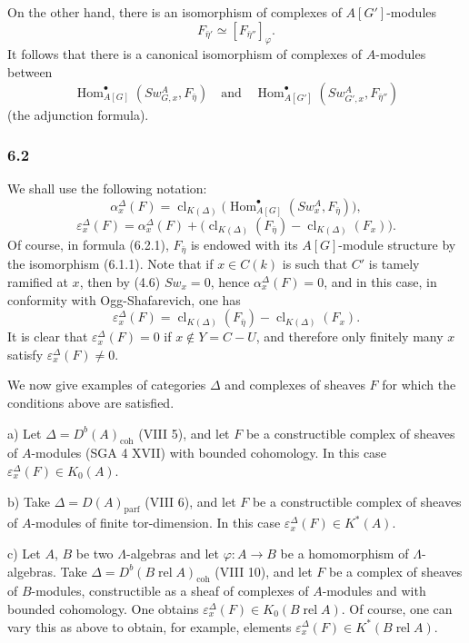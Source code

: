 \documentclass[11pt]{article}
\DeclareMathOperator{\Hom}{Hom}
\providecommand{\parf}{\mathrm{parf}}
\providecommand{\coh}{\mathrm{coh}}
\providecommand{\Hom}{\operatorname{Hom}}
\providecommand{\parf}{\mathrm{parf}}
\providecommand{\coh}{\mathrm{coh}}
\providecommand{\clK}[1]{\operatorname{cl}_{K(#1)}}
\providecommand{\Hom}{\operatorname{Hom}}
\begin{document}
On the other hand, there is an isomorphism of complexes of $A[G']$-modules
\[
F_{\bar\eta'}\simeq [F_{\bar\eta''}]_\varphi.
\]
It follows that there is a canonical isomorphism of complexes of $A$-modules between
\[
\Hom^\bullet_{A[G]}(Sw_{G,x}^A,F_{\bar\eta})
\quad\text{and}\quad
\Hom^\bullet_{A[G']}(Sw_{G',x}^A,F_{\bar\eta''})
\]
(the adjunction formula).

\subsubsection*{6.2}

We shall use the following notation:
\[
\alpha_x^\Delta(F)
=
\clK{\Delta}\bigl(\Hom^\bullet_{A[G]}(Sw_x^A,F_{\bar\eta})\bigr),
\tag{6.2.1}
\]
\[
\varepsilon_x^\Delta(F)
=
\alpha_x^\Delta(F)+
\bigl(\clK{\Delta}(F_{\bar\eta})-\clK{\Delta}(F_x)\bigr).
\tag{6.2.2}
\]
Of course, in formula (6.2.1), $F_{\bar\eta}$ is endowed with its $A[G]$-module structure by the isomorphism (6.1.1). Note that if $x\in C(k)$ is such that $C'$ is tamely ramified at $x$, then by (4.6) $Sw_x=0$, hence $\alpha_x^\Delta(F)=0$, and in this case, in conformity with Ogg-Shafarevich, one has
\[
\varepsilon_x^\Delta(F)=\clK{\Delta}(F_{\bar\eta})-\clK{\Delta}(F_x).
\tag{6.2.3}
\]
It is clear that $\varepsilon_x^\Delta(F)=0$ if $x\notin Y=C-U$, and therefore only finitely many $x$ satisfy $\varepsilon_x^\Delta(F)\ne0$.

We now give examples of categories $\Delta$ and complexes of sheaves $F$ for which the conditions above are satisfied.

a) Let $\Delta=D^b(A)_{\coh}$ (VIII 5), and let $F$ be a constructible complex of sheaves of $A$-modules (SGA 4 XVII) with bounded cohomology. In this case $\varepsilon_x^\Delta(F)\in K_0(A)$.

b) Take $\Delta=D(A)_{\parf}$ (VIII 6), and let $F$ be a constructible complex of sheaves of $A$-modules of finite tor-dimension. In this case $\varepsilon_x^\Delta(F)\in K^*(A)$.

c) Let $A$, $B$ be two $\Lambda$-algebras and let $\varphi:A\to B$ be a homomorphism of $\Lambda$-algebras. Take $\Delta=D^b(B\operatorname{ rel }A)_{\coh}$ (VIII 10), and let $F$ be a complex of sheaves of $B$-modules, constructible as a sheaf of complexes of $A$-modules and with bounded cohomology. One obtains $\varepsilon_x^\Delta(F)\in K_0(B\operatorname{ rel }A)$. Of course, one can vary this as above to obtain, for example, elements $\varepsilon_x^\Delta(F)\in K^*(B\operatorname{ rel }A)$.
\end{document}
